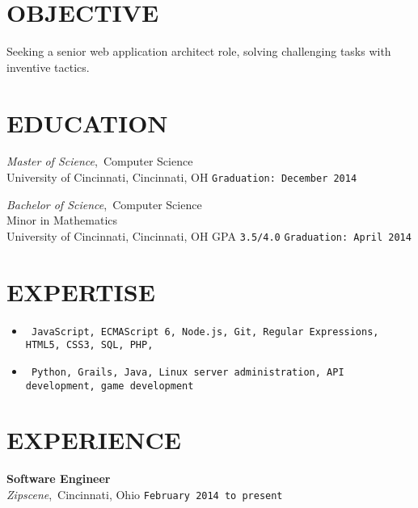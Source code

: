 \documentclass[11pt, line]{res}
\begin{document}
	\address{8228 Melrose Ln\\ Maineville, OH 45039\\ 513-259-0656\\ ross@rhadden.com}

	\begin{resume}
		\vspace{-28pt}
		\section{OBJECTIVE}
			Seeking a senior web application architect role, solving challenging tasks with inventive tactics.

		\vspace{-10pt}
		\section{EDUCATION}
				\textit{Master of Science},\, Computer Science \\
				University of Cincinnati, Cincinnati, OH
					\hfill \texttt{Graduation: December 2014}

			\vspace{-8pt}
				\textit{Bachelor of Science},\, Computer Science \\
				Minor in Mathematics \\
				University of Cincinnati, Cincinnati, OH
					\hspace{16pt} GPA \texttt{3.5/4.0}
					\hfill \texttt{Graduation: April 2014}

		\vspace{-10pt}
		\section{EXPERTISE}
			\begin{itemize}[leftmargin=0pt]
				\item[]
				\texttt{
					JavaScript,
					ECMAScript 6,
					Node.js,
					Git,
					Regular Expressions,
					HTML5,
					CSS3,
					SQL,
					PHP,
				}
				\item[]
				\texttt{
					Python,
					Grails,
					Java,
					Linux server administration,
					API development,
					game development
				}
			\end{itemize}

		\vspace{-10pt}
		\section{EXPERIENCE}
				\textbf{Software Engineer} \\
				\textit{Zipscene},\, Cincinnati, Ohio
					\hfill \texttt{February 2014 to present} \\


\end{resume}
\end{document}
